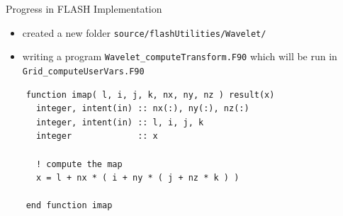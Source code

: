 \documentclass{beamer}
\begin{document}
\begin{frame}{Progress in FLASH Implementation}
  \begin{itemize}
    \setlength\itemsep{1em}
    \item created a new folder \texttt{source/flashUtilities/Wavelet/}
    \item writing a program \texttt{Wavelet\_computeTransform.F90} which will be run 
          in \texttt{Grid\_computeUserVars.F90}
  \end{itemize}
  \begin{verbatim}
    function imap( l, i, j, k, nx, ny, nz ) result(x)
      integer, intent(in) :: nx(:), ny(:), nz(:)
      integer, intent(in) :: l, i, j, k
      integer             :: x

      ! compute the map
      x = l + nx * ( i + ny * ( j + nz * k ) )

    end function imap
  \end{verbatim}
\end{frame}
\end{document}

